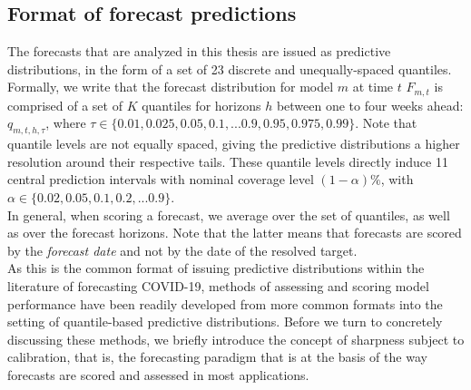 \subsection{Format of forecast predictions}
The forecasts that are analyzed in this thesis are issued as predictive distributions, in the form of a set of 23 discrete and unequally-spaced quantiles. Formally, we write that the forecast distribution for model $m$ at time $t$ $F_{m,t}$ is comprised of a set of $K$ quantiles for horizons $h$ between one to four weeks ahead: $q_{m, t, h, \tau}$, where $\tau \in \{0.01, 0.025, 0.05, 0.1, ... 0.9, 0.95, 0.975, 0.99\} $. Note that quantile levels are not equally spaced, giving the predictive distributions a higher resolution around their respective tails. These quantile levels directly induce 11 central prediction intervals with nominal coverage level $(1-\alpha)\%$, with $\alpha \in \{0.02, 0.05, 0.1, 0.2, ... 0.9\}$.\\
In general, when scoring a forecast, we average over the set of quantiles, as well as over the forecast horizons. Note that the latter means that forecasts are scored by the \textit{forecast date} and not by the date of the resolved target.\\
As this is the common format of issuing predictive distributions within the literature of forecasting COVID-19, methods of assessing and scoring model performance have been readily developed from more common formats into the setting of quantile-based predictive distributions. Before we turn to concretely discussing these methods, we briefly introduce the concept of sharpness subject to calibration, that is, the forecasting paradigm that is at the basis of the way forecasts are scored and assessed in most applications.
